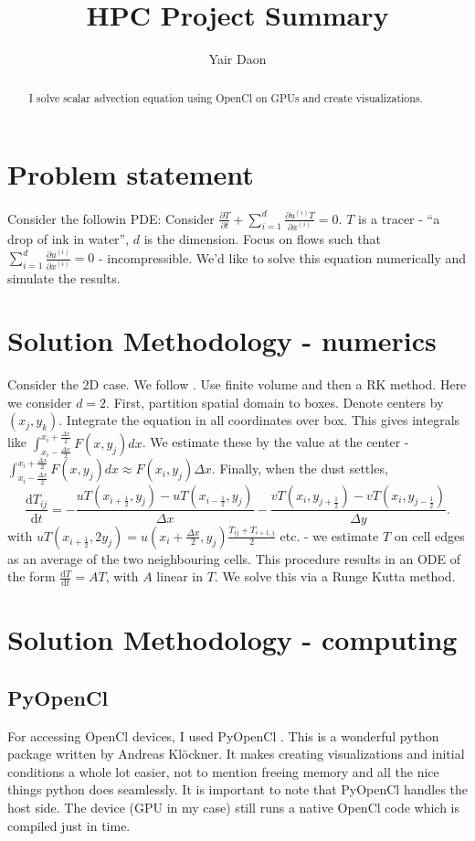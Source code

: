 \documentclass[paper=a4, fontsize=11pt]{scrartcl} %
\title{HPC Project Summary}
\author{Yair Daon}
\date{}
\numberwithin{equation}{section} %
\numberwithin{figure}{section} %
\numberwithin{table}{section} %
\newcommand{\der}{\text{d}}
\begin{document}
\maketitle
\begin{abstract}
I solve scalar advection equation using OpenCl on GPUs and create visualizations.
\end{abstract}
\section{Problem statement}
Consider the followin PDE:
Consider $\frac{\partial T}{\partial t} + \sum_{i=1}^{d} \frac{\partial u^{(i)}T}{\partial x^{(i)}} = 0$.
$T$ is a tracer - ``a drop of ink in water'', $d$ is the dimension. Focus on flows such that $\sum_{i=1}^{d} \frac{\partial u^{(i)}}{\partial x^{(i)}} = 0$ - incompressible.
We'd like to solve this equation numerically and simulate the results.



\section{Solution Methodology - numerics}
Consider the 2D case. We follow \cite{terrorist}. 
Use finite volume and then a RK method. Here we consider $d=2$. First, partition spatial domain to boxes. Denote centers by $(x_j, y_k)$.
Integrate the equation in all coordinates over box.  This gives integrals like 
$\int_{x_i - \frac{\Delta x}{2}}^{x_i + \frac{\Delta x}{2}} F(x,y_j) dx$. We estimate these by
the value at the center - $\int_{x_i - \frac{\Delta x}{2}}^{x_i + \frac{\Delta x}{2}} F(x,y_j) dx \approx F(x_i ,y_j)\Delta x$.
Finally, when the dust settles, 
  $$
  \frac{\der T_{ij}}{\der t} = -\frac{uT(x_{i+\frac{1}{2}} , y_j) - uT(x_{i-\frac{1}{2}} , y_j)}{\Delta x} -\frac{vT(x_i , y_{j+\frac{1}{2}}) - vT(x_i , y_{j-\frac{1}{2}})}{\Delta y}.
$$
with $uT(x_{i+\frac{1}{2}} ,2 y_j)= u(x_i + \frac{\Delta x}{2},y_j) \frac{T_{ij} + T_{i+1,j}}{2}$ etc. - we estimate $T$ on cell edges as 
an average of the two neighbouring cells. This procedure results in an ODE of the form $\frac{\der T}{\der t} = AT$, with $A$ linear in $T$. We solve this
via a Runge Kutta method.

\section{Solution Methodology - computing}

\subsection{PyOpenCl}
For accessing OpenCl devices, I used PyOpenCl \cite{pyopencl}. This is a wonderful python package written by Andreas Kl\"ockner. 
It makes creating visualizations and initial conditions a whole lot easier, not to 
mention freeing memory and all the nice things python does seamlessly. It is important to note that PyOpenCl handles the host side. 
The device (GPU in my case) still runs a native OpenCl code which is 
compiled just in time.
\end{document}
